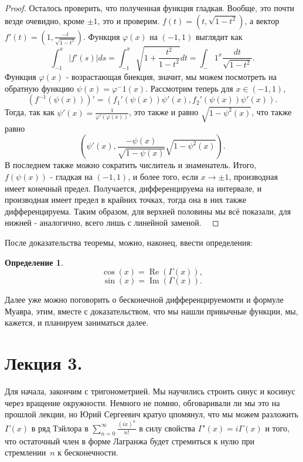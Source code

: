 \documentclass[a4paper,100pt]{article}
\theoremstyle{indented}
\theoremstyle{definition}
\newtheorem{defn}{Определение}
\theoremstyle{remark}
\DeclareMathOperator{\Imf}{Im}
\DeclareMathOperator{\Real}{Re}
\begin{document}
\begin{proof}
    Осталось проверить, что полученная функция гладкая. Вообще, это почти везде очевидно, кроме $\pm 1$, это и проверим. $f(t)=(t, \sqrt{1-t^2})$, а вектор $f'(t)=(1, \frac{-t}{\sqrt{1-t^2}})$. Функция $\varphi(x)$ на $(-1, 1)$ выглядит как
    \[
        \int_{-1}^x|f'(s)|ds=\int_{-1}^x\sqrt{1+\frac{t^2}{1-t^2}}dt=\int_-1^x\frac{dt}{\sqrt{1-t^2}}.
    \]
    Функция $\varphi(x)$ - возрастающая биекция, значит, мы можем посмотреть на обратную функцию $\psi(x)=\varphi^-1(x)$. Рассмотрим теперь для $x\in(-1, 1)$,
    \[
         (f^{-1}(\psi(x)))'=(f_1'(\psi(x))\psi'(x), f_2'(\psi(x))\psi'(x)).
    \]
    Тогда, так как $\psi'(x)=\frac{1}{\varphi'(\varphi(x))}$, это также и равно $\sqrt{1-\psi^2(x)}$, что также равно 
    \[
    (\psi'(x), \frac{-\psi(x)}{\sqrt{1-\psi(x)}}\sqrt{1-\psi^2(x)}).
    \]
    В последнем также можно сократить числитель и знаменатель. Итого, $f(\psi(x))$ - гладкая на $(-1, 1)$, и более того, если $x\rightarrow\pm 1$, производная имеет конечный предел. Получается, дифференцируема на интервале, и производная имеет предел в крайних точках, тогда она в них также дифференцируема. Таким образом, для верхней половины мы всё показали, для нижней - аналогично, всего лишь с линейной заменой. \ 


\end{proof}

После доказательства теоремы, можно, наконец, ввести определения:

\begin{defn}
    \[
        \cos(x)=\Real(\Gamma(x)), 
    \]
    \[
        \sin(x)=\Imf(\Gamma(x)).
    \]
\end{defn}

Далее уже можно поговорить о бесконечной дифференцируемомти и формуле Муавра, этим, вместе с доказательством, что мы нашли привычные функции, мы, кажется, и планируем заниматься далее.

\section{Лекция 3.}

Для начала, закончим с тригонометрией. Мы научились строить синус и косинус через вращение окружности. Немного не помню, обговаривали ли мы это на прошлой лекции, но Юрий Сергеевич кратуо цпомянул, что мы можем разложить $\Gamma(x)$ в ряд Тэйлора в $\sum_{n=0}^\infty\frac{(ix)^n}{n!}$ в силу свойства $\Gamma'(x)=i\Gamma(x)$ и того, что остаточный член в форме Лагранжа будет стремиться к нулю при стремлении $n$ к бесконечности. \ 
\end{document}
